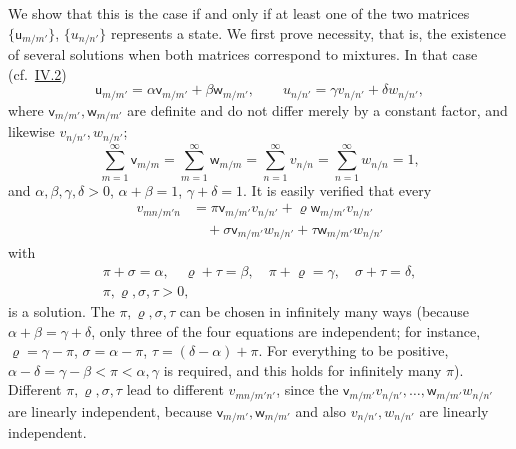 \documentclass[fontsize=13pt,twoside,openany,headings=normal,parskip=false,bookmarkpackage=false,DIV=calc]{scrbook}
\begin{document}
We show that this is the case if and only if at least one of the two matrices $\{\mathsf u_{m/m'}\}$, $\{u_{n/n'}\}$ represents a state. We first prove necessity, that is, the existence of several solutions when both matrices correspond to mixtures. In that case (cf.\ \hyperref[sec:IV.2]{IV.2})
\[
 \mathsf u_{m/m'}=\alpha \mathsf v_{m/m'}+\beta \mathsf w_{m/m'},\qquad
 u_{n/n'}=\gamma v_{n/n'}+\delta w_{n/n'},
\]
where $\mathsf v_{m/m'},\mathsf w_{m/m'}$ are definite and do not differ merely by a constant factor, and likewise $v_{n/n'},w_{n/n'}$;
\[
 \sum_{m=1}^{\infty}\mathsf v_{m/m}=\sum_{m=1}^{\infty}\mathsf w_{m/m}
 =\sum_{n=1}^{\infty}v_{n/n}=\sum_{n=1}^{\infty}w_{n/n}=1,
\]
and $\alpha,\beta,\gamma,\delta>0$, $\alpha+\beta=1$, $\gamma+\delta=1$. It is easily verified that every
\begin{align*}
 v_{mn/m'n}&=\pi \mathsf v_{m/m'}v_{n/n'}+\varrho \mathsf w_{m/m'}v_{n/n'}\\
 &\quad+\sigma \mathsf v_{m/m'}w_{n/n'}+\tau \mathsf w_{m/m'}w_{n/n'}
\end{align*}
\hypertarget{origpage-228}{}%
with
\begin{gather*}
 \pi+\sigma=\alpha,\quad\varrho+\tau=\beta,\quad
 \pi+\varrho=\gamma,\quad\sigma+\tau=\delta,\\
 \pi,\varrho,\sigma,\tau>0,
\end{gather*}
is a solution. The $\pi,\varrho,\sigma,\tau$ can be chosen in infinitely many ways (because $\alpha+\beta=\gamma+\delta$, only three of the four equations are independent; for instance, $\varrho=\gamma-\pi$, $\sigma=\alpha-\pi$, $\tau=(\delta-\alpha)+\pi$. For everything to be positive, $\alpha-\delta=\gamma-\beta<\pi<\alpha,\gamma$ is required, and this holds for infinitely many $\pi$). Different $\pi,\varrho,\sigma,\tau$ lead to different $v_{mn/m'n'}$, since the $\mathsf v_{m/m'}v_{n/n'},\ldots,\mathsf w_{m/m'}w_{n/n'}$ are linearly independent, because $\mathsf v_{m/m'},\mathsf w_{m/m'}$ and also $v_{n/n'},w_{n/n'}$ are linearly independent.
\end{document}
